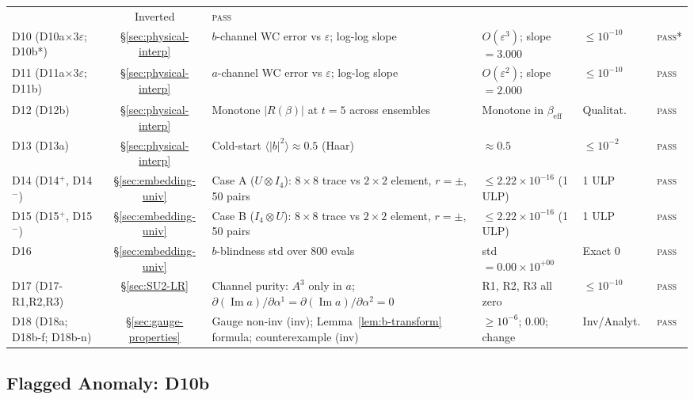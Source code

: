 \documentclass[12pt]{article}
\numberwithin{equation}{section}
\theoremstyle{plain}
\theoremstyle{definition}
\theoremstyle{remark}
\begin{document}
\begin{table}[ht]
\begin{tabular}{@{}l c p{4.4cm} p{3.2cm} l l@{}}
				& Inverted & \textsc{pass}\\
				D10 (D10a$\times 3\varepsilon$; D10b*)
				& \S\ref{sec:physical-interp}
				& $b$-channel WC error vs $\varepsilon$; log-log slope
				& $O(\varepsilon^{3})$; slope$=3.000$
				& $\leq 10^{-10}$ & \textsc{pass}*\\
				D11 (D11a$\times 3\varepsilon$; D11b)
				& \S\ref{sec:physical-interp}
				& $a$-channel WC error vs $\varepsilon$; log-log slope
				& $O(\varepsilon^{2})$; slope$=2.000$
				& $\leq 10^{-10}$ & \textsc{pass}\\
				D12 (D12b) & \S\ref{sec:physical-interp}
				& Monotone $|R(\beta)|$ at $t=5$ across ensembles
				& Monotone in $\beta_{\mathrm{eff}}$
				& Qualitat.\ & \textsc{pass}\\
				D13 (D13a) & \S\ref{sec:physical-interp}
				& Cold-start $\langle|b|^2\rangle\approx 0.5$ (Haar)
				& $\approx 0.5$
				& $\leq 10^{-2}$ & \textsc{pass}\\
				D14 (D14$^{+}$, D14$^{-}$) & \S\ref{sec:embedding-univ}
				& Case A ($U\otimes I_4$): $8\times 8$ trace vs
				$2\times 2$ element, $r=\pm$, 50 pairs
				& $\leq 2.22\times 10^{-16}$ (1 ULP)
				& 1 ULP & \textsc{pass}\\
				D15 (D15$^{+}$, D15$^{-}$) & \S\ref{sec:embedding-univ}
				& Case B ($I_4\otimes U$): $8\times 8$ trace vs
				$2\times 2$ element, $r=\pm$, 50 pairs
				& $\leq 2.22\times 10^{-16}$ (1 ULP)
				& 1 ULP & \textsc{pass}\\
				D16 & \S\ref{sec:embedding-univ}
				& $b$-blindness std over 800 evals
				& std $= 0.00\times 10^{+00}$
				& Exact $0$ & \textsc{pass}\\
				D17 (D17-R1,R2,R3) & \S\ref{sec:SU2-LR}
				& Channel purity: $A^{3}$ only in $a$;
				$\partial(\operatorname{Im} a)/\partial \alpha^{1}
				= \partial(\operatorname{Im} a)/\partial \alpha^{2} = 0$
				& R1, R2, R3 all zero
				& $\leq 10^{-10}$ & \textsc{pass}\\
				D18 (D18a; D18b-f; D18b-n) & \S\ref{sec:gauge-properties}
				& Gauge non-inv (inv);
				Lemma~\ref{lem:b-transform} formula;
				counterexample (inv)
				& $\geq 10^{-6}$; $0.00$; change
				& Inv/Analyt.\ & \textsc{pass}\\
				\bottomrule
			\end{tabular}
		\end{table}
		
		\subsection{Flagged Anomaly: D10b}
		\label{sec:flagged-D10b}
		
\end{document}
